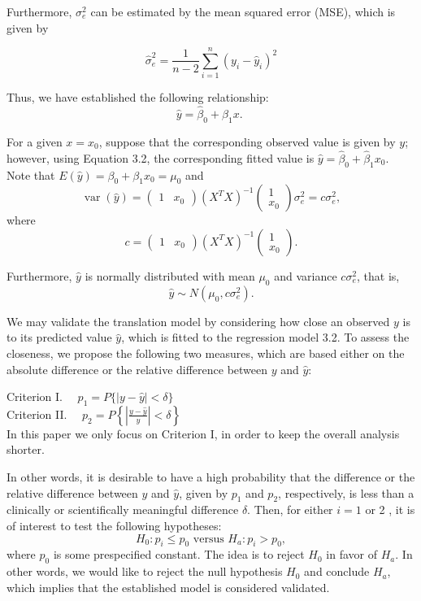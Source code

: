 \documentclass[
  12pt,
  a4paper,
]{article}
\numberwithin{equation}{section}
\theoremstyle{plain}
\theoremstyle{definition}
\theoremstyle{remark}
\theoremstyle{note}
\begin{document}
Furthermore, \(\sigma_e^2\) can be estimated by the mean squared error
(MSE), which is given by

\[
\hat{\sigma}_e^2=\frac{1}{n-2} \sum_{i=1}^n\left(y_i-\hat{y}_i\right)^2
\]

Thus, we have established the following relationship: \[
\hat{y}=\hat{\beta}_0+\hat{\beta}_1 x \text {. }
\]

For a given \(x=x_0\), suppose that the corresponding observed value is
given by \(y\); however, using Equation 3.2, the corresponding fitted
value is \(\hat{y}=\hat{\beta}_0+\hat{\beta}_1 x_0\). Note that
\(E(\hat{y})=\beta_0+\beta_1 x_0=\mu_0\) and \[
\operatorname{var}(\hat{y})=\left(\begin{array}{ll}
1 & x_0
\end{array}\right)\left(X^T X\right)^{-1}\left(\begin{array}{c}
1 \\
x_0
\end{array}\right) \sigma_e^2=c \sigma_e^2,
\] where \[
c=\left(\begin{array}{ll}
1 & x_0
\end{array}\right)\left(X^T X\right)^{-1}\left(\begin{array}{l}
1 \\
x_0
\end{array}\right) .
\]

Furthermore, \(\hat{y}\) is normally distributed with mean \(\mu_0\) and
variance \(c \sigma_e^2\), that is, \[
\hat{y} \sim N\left(\mu_0, c \sigma_e^2\right) .
\]

We may validate the translation model by considering how close an
observed \(y\) is to its predicted value \(\hat{y}\), which is fitted to
the regression model 3.2. To assess the closeness, we propose the
following two measures, which are based either on the absolute
difference or the relative difference between \(y\) and \(\hat{y}\):

Criterion I. \(\quad p_1=P\{|y-\hat{y}|<\delta\}\)\\

Criterion II.
\(\quad p_2=P\left\{\left|\frac{y-\hat{y}}{y}\right|<\delta\right\}\)\\

In this paper we only focus on Criterion I, in order to keep the overall
analysis shorter.

In other words, it is desirable to have a high probability that the
difference or the relative difference between \(y\) and \(\hat{y}\),
given by \(p_1\) and \(p_2\), respectively, is less than a clinically or
scientifically meaningful difference \(\delta\). Then, for either
\(i=1\) or 2 , it is of interest to test the following hypotheses: \[
H_0: p_i \leq p_0 \text { versus } H_a: p_i>p_0,
\] where \(p_0\) is some prespecified constant. The idea is to reject
\(H_0\) in favor of \(H_a\). In other words, we would like to reject the
null hypothesis \(H_0\) and conclude \(H_a\), which implies that the
established model is considered validated.
\end{document}
